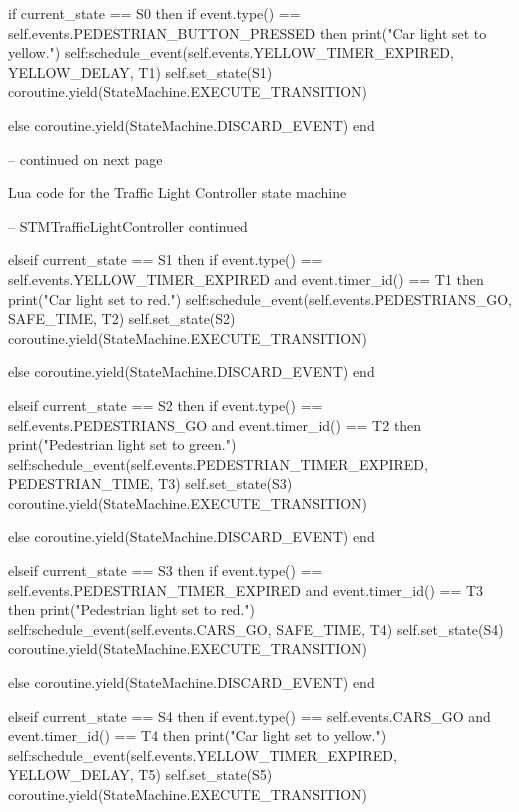 \begin{appendices}
\begin{listing}[H]
\begin{luacode}
		if current_state == S0 then
			if event.type() == self.events.PEDESTRIAN_BUTTON_PRESSED then
				print("Car light set to yellow.")
				self:schedule_event(self.events.YELLOW_TIMER_EXPIRED, YELLOW_DELAY, T1)
				self.set_state(S1)
				coroutine.yield(StateMachine.EXECUTE_TRANSITION)

			else
				coroutine.yield(StateMachine.DISCARD_EVENT)
			end
		
-- continued on next page
\end{luacode}
	\caption{Lua code for the Traffic Light Controller state machine}
	\label{code:traffic_light}
\end{listing}

\begin{listing}[H]
\begin{luacode}
-- STMTrafficLightController continued

	elseif current_state == S1 then
			if event.type() == self.events.YELLOW_TIMER_EXPIRED
			     and event.timer_id() == T1 then
				print("Car light set to red.")
				self:schedule_event(self.events.PEDESTRIANS_GO, SAFE_TIME, T2)
				self.set_state(S2)
				coroutine.yield(StateMachine.EXECUTE_TRANSITION)

			else
				coroutine.yield(StateMachine.DISCARD_EVENT)
			end

		elseif current_state == S2 then
			if event.type() == self.events.PEDESTRIANS_GO
			     and event.timer_id() == T2 then
				print("Pedestrian light set to green.")
				self:schedule_event(self.events.PEDESTRIAN_TIMER_EXPIRED, PEDESTRIAN_TIME, T3)
				self.set_state(S3)
				coroutine.yield(StateMachine.EXECUTE_TRANSITION)

			else
				coroutine.yield(StateMachine.DISCARD_EVENT)
			end

		elseif current_state == S3 then
			if event.type() == self.events.PEDESTRIAN_TIMER_EXPIRED
			     and event.timer_id() == T3 then
				print("Pedestrian light set to red.")
				self:schedule_event(self.events.CARS_GO, SAFE_TIME, T4)
				self.set_state(S4)
				coroutine.yield(StateMachine.EXECUTE_TRANSITION)

			else
				coroutine.yield(StateMachine.DISCARD_EVENT)
			end

		elseif current_state == S4 then
			if event.type() == self.events.CARS_GO
			     and event.timer_id() == T4 then
				print("Car light set to yellow.")
				self:schedule_event(self.events.YELLOW_TIMER_EXPIRED, YELLOW_DELAY, T5)
				self.set_state(S5)
				coroutine.yield(StateMachine.EXECUTE_TRANSITION)


\end{luacode}
\end{listing}
\end{appendices}
